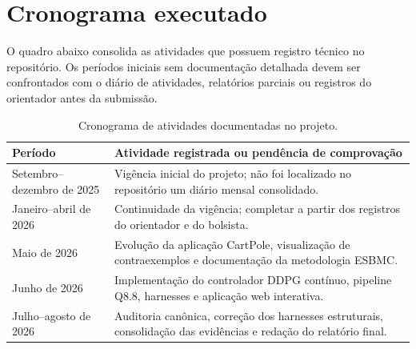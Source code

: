\documentclass[
  12pt,
  oneside,
  a4paper,
  chapter=TITLE,
  brazilian
]{abntex2}
\begin{document}


\appendix
\chapter{Cronograma executado}
O quadro abaixo consolida as atividades que possuem registro técnico no
repositório. Os períodos iniciais sem documentação detalhada devem ser
confrontados com o diário de atividades, relatórios parciais ou registros do
orientador antes da submissão.

\begin{table}[H]
\centering
\caption{Cronograma de atividades documentadas no projeto.}
\label{tab:cronograma}
\begin{tabularx}{\textwidth}{p{}Y}
\toprule
Período & Atividade registrada ou pendência de comprovação \\
\midrule
Setembro--dezembro de 2025 & Vigência inicial do projeto; não foi localizado no repositório um diário mensal consolidado. \\
Janeiro--abril de 2026 & Continuidade da vigência; completar a partir dos registros do orientador e do bolsista. \\
Maio de 2026 & Evolução da aplicação CartPole, visualização de contraexemplos e documentação da metodologia ESBMC. \\
Junho de 2026 & Implementação do controlador DDPG contínuo, pipeline Q8.8, harnesses e aplicação web interativa. \\
Julho--agosto de 2026 & Auditoria canônica, correção dos harnesses estruturais, consolidação das evidências e redação do relatório final. \\
\bottomrule
\end{tabularx}
\end{table}
\end{document}
